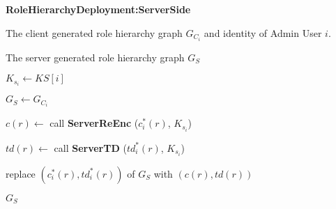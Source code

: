 \documentclass[final,5p,times,twocolumn]{elsarticle}
\newcommand{\algofontsize}{\fontsize{7}{8}\selectfont}
\begin{document}
\begin{algorithm}[htp]
{\algofontsize
\caption{\textbf{RoleHierarchyDeployment:ServerSide}}

\label{algo:deploy-role-hierarchy-server-side}

\begin{algorithmic}[1]

\REQUIRE The client generated role hierarchy graph $G_{C_i}$ and identity of Admin User $i$.

\ENSURE The server generated role hierarchy graph $G_{S}$

\medskip

\STATE $K_{s_i} \leftarrow KS[i]$ {\algofontsize {}} \label{line:deploy-rh-ss-ks}

\STATE $G_{S} \leftarrow G_{C_i}$ \label{line:deploy-rh-ss-copy}

 \label{line:deploy-rh-ss-loop}

	\STATE $c(r) \leftarrow$ call \textbf{ServerReEnc} ($c^*_i (r)$, $K_{s_i}$) \label{line:deploy-rh-ss-enc}
	
	\STATE $td(r) \leftarrow$ call \textbf{ServerTD} ($td^*_i (r)$, $K_{s_i}$) {\algofontsize {}} \label{line:deploy-rh-ss-td}
	
	\STATE replace $(c^*_i (r), td^*_i (r))$ of $G_{S}$ with $(c(r), td(r))$ \label{line:deploy-rh-ss-replace}

\ENDFOR

\RETURN $G_{S}$

\end{algorithmic}
}
\end{algorithm}
\end{document}
